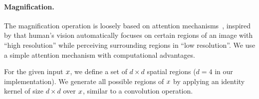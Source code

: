 %
%
%
%

\paragraph*{Magnification.\;}
\label{sec:mag}

The magnification operation is loosely based on attention mechanisms~\cite{gregor:2015:arxiv,Almahairi:2016:icml}, inspired by that human's vision automatically focuses on certain regions of an image with ``high resolution'' while perceiving surrounding regions in ``low resolution''. We use a simple attention mechanism with computational advantages.




For the given input $x$, we define a set of $d \times d$ spatial regions ($d=4$ in our implementation). We generate all possible regions of $x$ by applying an identity kernel of size $d\times d$ over $x$, similar to a convolution operation.

